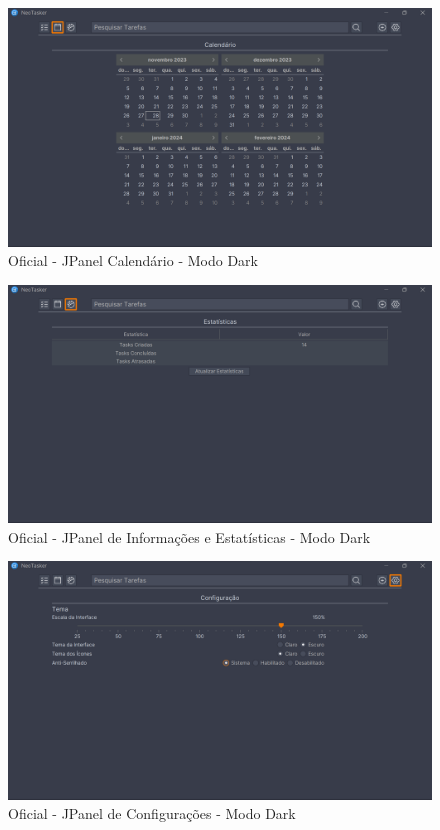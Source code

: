 \documentclass[a4paper,12pt]{article}
\begin{document}
\begin{figure}[H]
	\centering
	\includegraphics[scale=0.19]{prototypes/oficial_dark/calendar.png}
	\caption{Oficial - JPanel Calendário - Modo Dark}
\end{figure}

\begin{figure}[H]
	\centering
	\includegraphics[scale=0.19]{prototypes/oficial_dark/stats.png}
	\caption{Oficial - JPanel de Informações e Estatísticas - Modo Dark}
\end{figure}

\pagebreak

\begin{figure}[H]
	\centering
	\includegraphics[scale=0.19]{prototypes/oficial_dark/config.png}
	\caption{Oficial - JPanel de Configurações - Modo Dark}
\end{figure}
\end{document}
